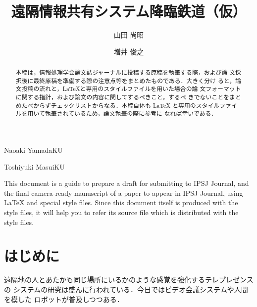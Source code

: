 \documentclass[submit,techreq]{ipsj}
\begin{document}
\title{遠隔情報共有システム降臨鉄道（仮）\\
}



\author{山田 尚昭}{Naoaki Yamada}{KU}
\author{増井 俊之}{Toshiyuki Masui}{KU}

\begin{abstract}
本稿は，情報処理学会論文誌ジャーナルに投稿する原稿を執筆する際，および論
文採択後に最終原稿を準備する際の注意点等をまとめたものである．大きく分け
ると，論文投稿の流れと，\LaTeX と専用のスタイルファイルを用いた場合の論
文フォーマットに関する指針，および論文の内容に関してするべきこと，するべ
きでないことをまとめたべからずチェックリストからなる．本稿自体も \LaTeX
と専用のスタイルファイルを用いて執筆されているため，論文執筆の際に参考に
なれば幸いである．
\end{abstract}


%
\begin{eabstract}
This document is a guide to prepare a draft for submitting to IPSJ
Journal, and the final camera-ready manuscript of a paper to appear in
IPSJ Journal, using {\LaTeX} and special style files.  Since this
document itself is produced with the style files, it will help you to
refer its source file which is distributed with the style files.
\end{eabstract}
%

\maketitle

\section{はじめに}

遠隔地の人とあたかも同じ場所にいるかのような感覚を強化するテレプレゼンスの
システムの研究は盛んに行われている．今日ではビデオ会議システムや人間を模した
ロボットが普及しつつある．
\end{document}
